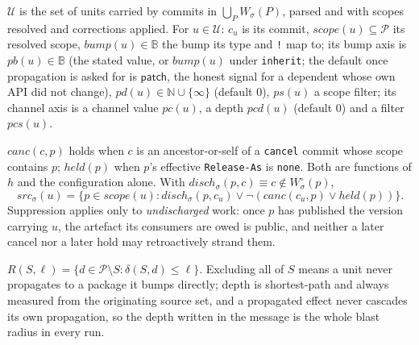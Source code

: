 \documentclass[sigconf,nonacm]{acmart}
\newcommand{\code}[1]{\texttt{#1}}
\begin{document}
\begin{definition}[units]
$\mathcal{U}$ is the set of units carried by commits in
$\bigcup_P W_\sigma(P)$, parsed and with scopes resolved and corrections
applied. For $u \in \mathcal{U}$: $c_u$ is its commit,
$\mathit{scope}(u) \subseteq \mathcal{P}$ its resolved scope,
$\mathit{bump}(u) \in \mathbb{B}$ the bump its type and \code{!} map to;
its bump axis is $\mathit{pb}(u) \in \mathbb{B}$ (the stated value, or
$\mathit{bump}(u)$ under \code{inherit}; the default once propagation is
asked for is $\mathsf{patch}$, the honest signal for a dependent whose
own API did not change), $\mathit{pd}(u) \in \mathbb{N} \cup
\{\infty\}$ (default $0$), $\mathit{ps}(u)$ a scope filter; its channel
axis is a channel value $\mathit{pc}(u)$, a depth $\mathit{pcd}(u)$
(default $0$) and a filter $\mathit{pcs}(u)$.
\end{definition}

\begin{definition}
\label{def:src}
$\mathit{canc}(c,p)$ holds when $c$ is an ancestor-or-self of a
\code{cancel} commit whose scope contains $p$; $\mathit{held}(p)$ when
$p$'s effective \code{Release-As} is \code{none}. Both are functions of
$h$ and the configuration alone. With $\mathit{disch}_\sigma(p,c)
\equiv c \notin W^\circ_\sigma(p)$,
\begin{equation}
  \mathit{src}_\sigma(u) = \{ p \in \mathit{scope}(u) :
    \mathit{disch}_\sigma(p,c_u) \lor
    \lnot(\mathit{canc}(c_u,p) \lor \mathit{held}(p)) \}.
  \label{eq:src}
\end{equation}
Suppression applies only to \emph{undischarged} work: once $p$ has
published the version carrying $u$, the artefact its consumers are owed
is public, and neither a later cancel nor a later hold may retroactively
strand them.
\end{definition}

\begin{definition}[reach]
\label{def:reach}
$R(S,\ell) = \{ d \in \mathcal{P} \setminus S : \delta(S,d) \leq \ell
\}$. Excluding all of $S$ means a unit never propagates to a package it
bumps directly; depth is shortest-path and always measured from the
originating source set, and a propagated effect never cascades its own
propagation, so the depth written in the message is the whole blast
radius in every run.
\end{definition}
\end{document}
